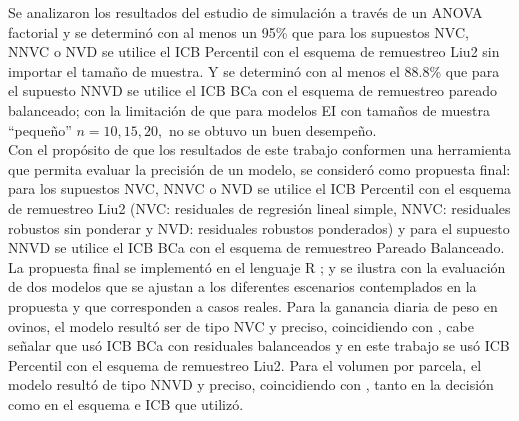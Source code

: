 Se analizaron los resultados del estudio de simulación a través de un ANOVA factorial y se determinó con al menos un 95\% que para los supuestos NVC, NNVC o NVD se utilice el ICB Percentil con el esquema de remuestreo Liu2 sin importar el tamaño de muestra. Y se determinó con al menos el 88.8\% que para el supuesto NNVD se utilice el ICB BCa con el esquema de remuestreo pareado balanceado; con la limitación de que para modelos EI con tamaños de muestra “pequeño” $n=10, 15, 20,$ no se obtuvo un buen desempeño. \\


Con el propósito de que los resultados de este trabajo conformen una herramienta que permita evaluar la precisión de un modelo, se consideró como propuesta final: para los supuestos NVC, NNVC o NVD se utilice el ICB Percentil con el esquema de remuestreo Liu2 (NVC: residuales de regresión lineal simple, NNVC: residuales robustos sin ponderar y NVD: residuales robustos ponderados) y para el supuesto NNVD se utilice el ICB BCa con el esquema de remuestreo Pareado Balanceado. La propuesta final se implementó en el lenguaje R \parencite{R-2024}; y se ilustra con la evaluación de dos modelos que se ajustan a los diferentes escenarios contemplados en la propuesta y que corresponden a casos reales. Para la ganancia diaria de peso en ovinos, el modelo resultó ser de tipo NVC y preciso, coincidiendo con \textcite{balam-2012}, cabe señalar que usó ICB BCa con residuales balanceados y en este trabajo se usó ICB Percentil con el esquema de remuestreo Liu2. Para el volumen por parcela, el modelo resultó de tipo NNVD y preciso, coincidiendo con \textcite{balam-2012}, tanto en la decisión como en el esquema e ICB que utilizó.